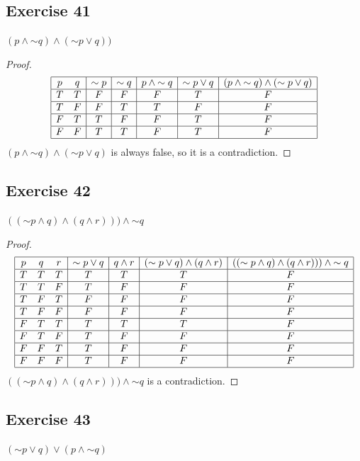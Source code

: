 \documentclass[14pt]{extarticle}
\begin{document}
\subsection{Exercise 41}
$(p \wedge {\sim q}) \wedge ({\sim p} \vee q))$

\begin{proof}
$$
\begin{array}{|cc|c|c|c|c|c|}
\hline
p & q & {\sim p} & {\sim q} & p \wedge {\sim q} & {\sim p} \vee q & (p \wedge {\sim q}) \wedge ({\sim p} \vee q) \\
\hline
T & T & F & F & F & T & F \\
\hline
T & F & F & T & T & F & F \\
\hline
F & T & T & F & F & T & F \\
\hline
F & F & T & T & F & T & F \\
\hline
\end{array}
$$
$(p \wedge {\sim q}) \wedge ({\sim p} \vee q)$ is always false, so it is a contradiction.
\end{proof}

\subsection{Exercise 42} $(({\sim p} \wedge q) \wedge (q \wedge r))) \wedge
{\sim q}$

\begin{proof}
$$
\begin{array}{|ccc|c|c|c|c|}
\hline
p & q & r & {\sim p} \vee q & q \wedge r & ({\sim p} \vee q) \wedge (q \wedge r)& (({\sim p} \wedge q) \wedge (q \wedge r))) \wedge {\sim q} \\
\hline
T & T & T & T & T & T & F \\
\hline
T & T & F & T & F & F & F \\
\hline
T & F & T & F & F & F & F \\
\hline
T & F & F & F & F & F & F \\
\hline
F & T & T & T & T & T & F \\
\hline
F & T & F & T & F & F & F \\
\hline
F & F & T & T & F & F & F \\
\hline
F & F & F & T & F & F & F \\
\hline
\end{array}
$$
$(({\sim p} \wedge q) \wedge (q \wedge r))) \wedge {\sim q}$ is a contradiction.
\end{proof}

\subsection{Exercise 43}
$({\sim p} \vee q) \vee (p \wedge {\sim q})$
\end{document}
